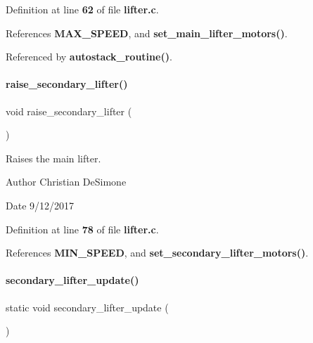 Definition at line \textbf{ 62} of file \textbf{ lifter.\+c}.



References \textbf{ M\+A\+X\+\_\+\+S\+P\+E\+ED}, and \textbf{ set\+\_\+main\+\_\+lifter\+\_\+motors()}.



Referenced by \textbf{ autostack\+\_\+routine()}.

\mbox{\label{lifter_8c_a786f679ea48bb8c80e00fbac9a69911b}} 
\paragraph{raise\+\_\+secondary\+\_\+lifter()}
{\footnotesize\ttfamily void raise\+\_\+secondary\+\_\+lifter (\begin{DoxyParamCaption}{ }\end{DoxyParamCaption})}



Raises the main lifter. 

\begin{DoxyAuthor}{Author}
Christian De\+Simone 
\end{DoxyAuthor}
\begin{DoxyDate}{Date}
9/12/2017 
\end{DoxyDate}


Definition at line \textbf{ 78} of file \textbf{ lifter.\+c}.



References \textbf{ M\+I\+N\+\_\+\+S\+P\+E\+ED}, and \textbf{ set\+\_\+secondary\+\_\+lifter\+\_\+motors()}.

\mbox{\label{lifter_8c_ac59fe6ffc80bab7f117ec0a8e482277b}} 
\paragraph{secondary\+\_\+lifter\+\_\+update()}
{\footnotesize\ttfamily static void secondary\+\_\+lifter\+\_\+update (\begin{DoxyParamCaption}{ }\end{DoxyParamCaption})\hspace{0.3cm}{\ttfamily [static]}}



